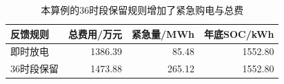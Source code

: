 \begin{table}[H]
\centering\small
\caption{本算例的36时段保留规则增加了紧急购电与总费}
\label{tab:feedback_benchmark}
\begin{tabular}{lrrr}\toprule
反馈规则 & 总费用/万元 & 紧急量/MWh & 年底SOC/kWh \\\midrule
即时放电 & 1386.39 & 85.48 & 1552.80 \\
36时段保留 & 1473.88 & 265.12 & 1552.80 \\
\bottomrule\end{tabular}
\end{table}
